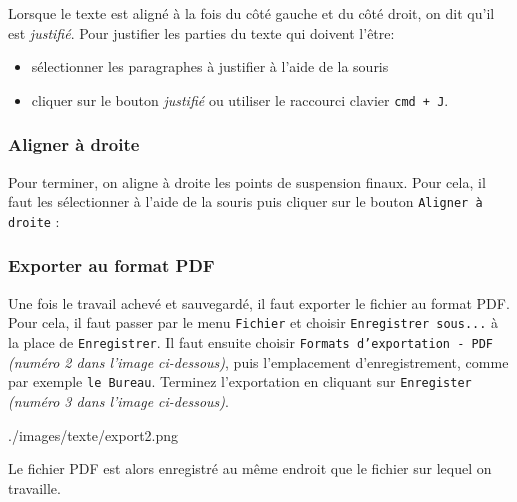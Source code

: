 Lorsque le texte est aligné à la fois du côté gauche et du côté droit, on dit qu'il est \emph{justifié}. Pour justifier les parties du texte qui doivent l'être:

\begin{itemize}
\item sélectionner les paragraphes à justifier à l'aide de la souris
\item cliquer sur le bouton \emph{justifié} ou utiliser le raccourci clavier \texttt{cmd + J}. 
\end{itemize}






\subsubsection{Aligner à droite}  

Pour terminer, on aligne à droite les points de suspension finaux. Pour cela, il faut les sélectionner à l'aide de la souris puis cliquer sur le bouton \texttt{Aligner à droite} :  




\subsubsection{Exporter au format PDF}

Une fois le travail achevé et sauvegardé, il faut exporter le fichier au format PDF. Pour cela, il faut 
passer par le menu \texttt{Fichier} et choisir \texttt{Enregistrer sous...} à la place de \texttt{Enregistrer}. Il faut ensuite choisir \texttt{Formats d'exportation - PDF} \textit{(numéro 2 dans l'image ci-dessous)}, puis l'emplacement d'enregistrement, comme par exemple \texttt{le Bureau}. Terminez l'exportation en cliquant sur \texttt{Enregister} \textit{(numéro 3 dans l'image ci-dessous)}.

%
                {./images/texte/export2.png}{\textwidth}



Le fichier PDF est alors enregistré au même endroit que le fichier sur lequel on travaille.










